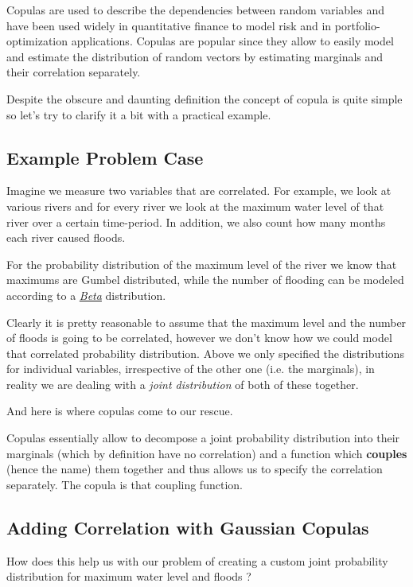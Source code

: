 Copulas are used to describe the dependencies between random variables and
have been used widely in quantitative finance to model risk and in portfolio-optimization 
applications. Copulas are popular since
they allow to easily model and estimate the distribution of random
vectors by estimating marginals and their correlation separately.

Despite the obscure and daunting definition the concept of copula is
quite simple so let's try to clarify it a bit with a practical example.

\subsection{Example Problem Case}\label{example-problem-case}

Imagine we measure two variables that are 
correlated. For example, we look at various rivers and for every river
we look at the maximum water level of that river over a certain
time-period. In addition, we also count how many months each river
caused floods.

For the probability distribution of the maximum level of the river we
know that maximums are Gumbel distributed, while the number of flooding
can be modeled according to a
\href{https://en.wikipedia.org/wiki/Beta_distribution}{\emph{Beta}}
distribution.

Clearly it is pretty reasonable to assume that the maximum level and the
number of floods is going to be correlated, however we don't know how
we could model that correlated probability distribution.
Above we only
specified the distributions for individual variables, irrespective of
the other one (i.e. the marginals), in reality we are dealing with a
\emph{joint distribution} of both of these together.

And here is where copulas come to our rescue.

Copulas essentially allow to decompose a joint probability distribution
into their marginals (which by definition have no correlation) and a
function which \textbf{couples} (hence the name) them together and thus allows us
to specify the correlation separately. The copula is that coupling
function.

\subsection{Adding Correlation with Gaussian Copulas}\label{adding-correlation-with-gaussian-copulas}

How does this help us with our problem of creating a custom joint
probability distribution for maximum water level and floods ?

